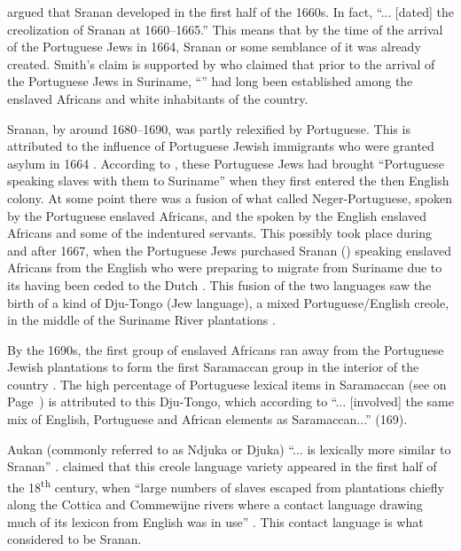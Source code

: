\citet{Smith09, Smith06, Smith02} argued that Sranan developed in the first half of the 1660s. In fact, \citet[316]{Smith09} ``... [dated] the creolization of Sranan at 1660--1665.'' This means that by the time of the arrival of the Portuguese Jews in 1664, Sranan or some semblance of it was already created. Smith's claim is supported by \citet[28]{Rens53} who claimed that prior to the arrival of the Portuguese Jews in Suriname, ``'' had long been established among the enslaved Africans and white inhabitants of the country.

Sranan, by around 1680--1690, was partly relexified by Portuguese. This is attributed to the influence of Portuguese Jewish immigrants who were granted asylum in 1664  \citep{McWhorter11, Smith06, Holm89}. According to  \citet[156]{Smith08b}, these Portuguese Jews had brought ``Portuguese speaking slaves with them to Suriname'' when they first entered the then English colony. At some point there was a fusion of what \citet{Rens53} called Neger-Portuguese, spoken by the Portuguese enslaved Africans, and the  spoken by the English enslaved Africans and some of the indentured servants. This possibly took place during and after 1667, when the Portuguese Jews purchased Sranan () speaking enslaved Africans from the English who were preparing to migrate from Suriname due to its having been ceded to the Dutch \citep{Ehrlich09, Mufwene01, Friedman99, McWhorter98, Wurm96, Rens53}. This fusion of the two languages saw the birth of a kind of Dju-Tongo (Jew language), a mixed Portuguese/English creole, in the middle of the Suriname River plantations \citep{Arends95}.

By the 1690s, the first group of enslaved Africans ran away from the Portuguese Jewish plantations to form the first Saramaccan group in the interior of the country \citep{Huber99}. The high percentage of Portuguese lexical items in Saramaccan (see  on Page~\pageref{Table1.1}) is attributed to this Dju-Tongo, which according to \citet{Arends95} ``... [involved] the same mix of English, Portuguese and African elements as Saramaccan...'' (169).

Aukan (commonly referred to as Ndjuka or Djuka) ``... is lexically more similar to Sranan''  \citep[Introduction]{Huttar94}. \citet{Huttar94} claimed that this creole language variety appeared in the first half of the 18\textsuperscript{th} century, when ``large numbers of slaves escaped from plantations chiefly along the Cottica and Commewijne rivers where a contact language drawing much of its lexicon from English was in use'' \citep[Introduction]{Huttar94}. This contact language is what \citet{McWhorter98}  considered to be Sranan.

